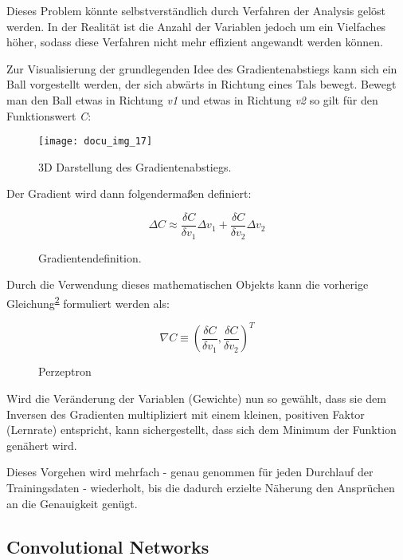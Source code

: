 Dieses Problem könnte selbstverständlich durch Verfahren der Analysis gelöst werden. In der Realität ist die Anzahl der
Variablen jedoch um ein Vielfaches höher, sodass diese Verfahren nicht mehr effizient angewandt werden können.

Zur Visualisierung der grundlegenden Idee des Gradientenabstiegs kann sich ein Ball vorgestellt werden, der sich abwärts
in Richtung eines Tals bewegt. Bewegt man den Ball etwas in Richtung \textit{v1} und etwas in Richtung \textit{v2}
so gilt für den Funktionswert \textit{C}:

\begin{figure}[h]
    \centering
    \texttt{[image: docu\_img\_17]}
    \caption{3D Darstellung des Gradientenabstiegs.}
    \label{fig:gradient-decent-3d}
\end{figure}

Der Gradient wird dann folgendermaßen definiert:

\begin{figure}[h]
    \centering
    \[ \Delta C \approx
          \frac{\delta C}{\delta v_1} \Delta v_1 + \frac{\delta C}{\delta v_2} \Delta v_2
    \]
    \caption{Gradientendefinition.}
    \label{fig:gradient-decent-definition}
\end{figure}

Durch die Verwendung dieses mathematischen Objekts kann die vorherige Gleichung\textsuperscript{\ref{fig:gradient-decent-definition}} formuliert werden als:

\begin{figure}[h]
    \centering
    \[ \nabla C \equiv
        (\frac{\delta C}{\delta v_1},\frac{\delta C}{\delta v_2})^T
    \]
    \caption{Perzeptron}
    \label{fig:gradient-decent-defition-2}
\end{figure}

Wird die Veränderung der Variablen (Gewichte) nun so gewählt, dass sie dem Inversen des Gradienten multipliziert mit
einem kleinen, positiven Faktor (Lernrate) entspricht, kann sichergestellt, dass sich dem Minimum der Funktion
genähert wird.

Dieses Vorgehen wird mehrfach - genau genommen für jeden Durchlauf der Trainingsdaten - wiederholt, bis die dadurch erzielte Näherung den
Ansprüchen an die Genauigkeit genügt.

\subsection{Convolutional Networks}

